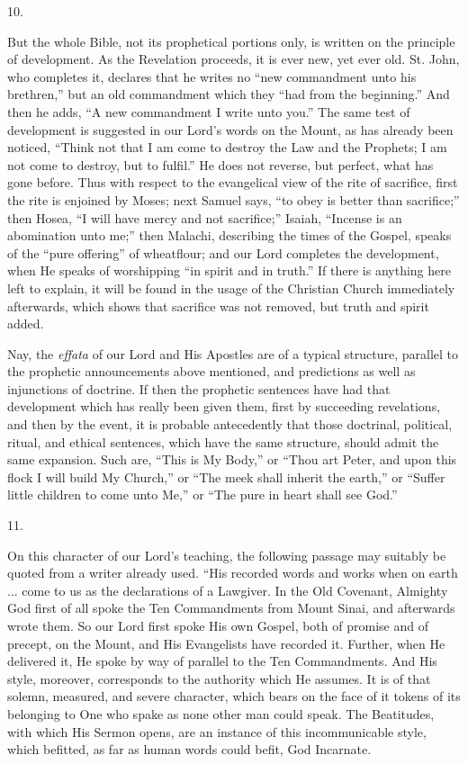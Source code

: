10.

But the whole Bible, not its prophetical portions
only, is written on the principle of development. As the
Revelation proceeds, it is ever new, yet ever old. St.
John, who completes it, declares that he writes no
``new commandment unto his brethren,'' but an old
commandment which they ``had from the
beginning.'' And then he adds, ``A new
commandment I write unto you.'' The same test of
development is suggested in our Lord's words on the
Mount, as has already been noticed, ``Think not that
I am come to destroy the Law and the Prophets; I am not
come to destroy, but to fulfil.'' He does not
reverse, but perfect, what has gone before. Thus with
respect to the evangelical view of the rite of sacrifice,
first the rite is enjoined by Moses; next Samuel says,
``to obey is better than sacrifice;'' then Hosea,
``I will have mercy and not sacrifice;'' Isaiah,
``Incense is an abomination unto me;'' then
Malachi, describing the times of the Gospel, speaks of
the ``pure offering'' of wheatflour; and our
Lord completes the development, when He speaks of
worshipping ``in spirit and in truth.'' If there
is anything here left to explain, it will be found in the
usage of the Christian Church immediately afterwards,
which shows that sacrifice was not removed, but truth and
spirit added.

Nay, the \emph{effata} of our Lord and His Apostles
are of a typical structure, parallel to the prophetic
announcements above mentioned, and predictions as well as
injunctions of doctrine. If then the prophetic sentences
have had that development which has really been given
them, first by succeeding revelations, and then by the
event, it is probable antecedently that those doctrinal,
political, ritual, and ethical sentences, which have the
same structure, should admit the same expansion. Such
are, ``This is My Body,'' or ``Thou art
Peter, and upon this flock I will build My Church,''
or ``The meek shall inherit the earth,'' or
``Suffer little children to come unto Me,'' or
``The pure in heart shall see God.''

11.

On this character of our Lord's teaching, the
following passage may suitably be quoted from a writer
already used. ``His recorded words and works when on
earth ... come to us as the declarations of a Lawgiver.
In the Old Covenant, Almighty God first of all spoke the
Ten Commandments from Mount Sinai, and afterwards wrote
them. So our Lord first spoke His own Gospel, both of
promise and of precept, on the Mount, and His Evangelists
have recorded it. Further, when He delivered it, He spoke
by way of parallel to the Ten Commandments. And His
style, moreover, corresponds to the authority which He
assumes. It is of that solemn, measured, and severe
character, which bears on the face of it tokens of its
belonging to One who spake as none other man could speak.
The Beatitudes, with which His Sermon opens, are an
instance of this incommunicable style, which befitted, as
far as human words could befit, God Incarnate.

